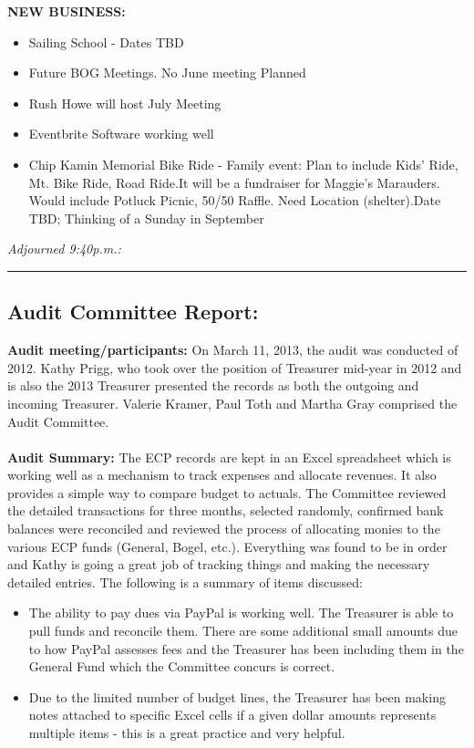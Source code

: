 \documentclass[10pt,a4paper]{article}
\newcommand\subsect[1]{%
  \subsection*{#1}%
  \addcontentsline{toc}{subsection}{#1}}
\begin{document}
\begin{multicols}{2}
\textbf{NEW BUSINESS:}
\begin{itemize}
\item Sailing School - Dates TBD 
\item Future BOG Meetings. No June meeting Planned
\item Rush Howe will host July Meeting
\item Eventbrite Software working well
\item Chip Kamin Memorial Bike Ride - Family event:  Plan to include Kids' Ride, Mt. Bike Ride, Road Ride.It will be a fundraiser for Maggie's Marauders. Would include Potluck Picnic, 50/50 Raffle. Need Location (shelter).Date TBD;  Thinking of a Sunday in September
\end{itemize}

\textit{Adjourned 9:40p.m.:}

\hrule 

\subsect{Audit Committee Report:}

\textbf{Audit meeting/participants:}  On March 11, 2013, the audit was conducted of 2012.  Kathy Prigg, who took over the position of Treasurer mid-year in 2012 and is also the 2013 Treasurer presented the records as both the outgoing and incoming Treasurer.  Valerie Kramer, Paul Toth and Martha Gray comprised the Audit Committee.
\\
\\
\textbf{Audit Summary:}  The ECP records are kept in an Excel spreadsheet which is working well as a mechanism to track expenses and allocate revenues.  It also provides a simple way to compare budget to actuals. The Committee reviewed the detailed transactions for three months, selected randomly, confirmed bank balances were reconciled and reviewed the process of allocating monies to the various ECP funds (General, Bogel, etc.).  Everything was found to be in order and Kathy is going a great job of tracking things and making the necessary detailed entries.  The following is a summary of items discussed:

\begin{itemize}
\item The ability to pay dues via PayPal is working well.  The Treasurer is able to pull funds and reconcile them.  There are some additional small amounts due to how PayPal assesses fees and the Treasurer has been including them in the General Fund which the Committee concurs is correct.

\item Due to the limited number of budget lines, the Treasurer has been making notes attached to specific Excel cells if a given dollar amounts represents multiple items - this is a great practice and very helpful.


\end{itemize}
\end{multicols}
\end{document}
